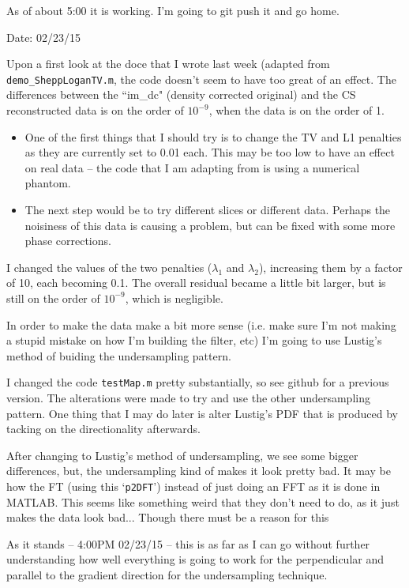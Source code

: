 \documentclass[pra,11 pt]{revtex4-1}
\begin{document}
As of about 5:00 it is working. I'm going to git push it and go home.


Date: 02/23/15

Upon a first look at the doce that I wrote last week (adapted from \verb!demo_SheppLoganTV.m!, the code doesn't seem to have too great of an effect. The differences between the ``im\_dc" (density corrected original) and the CS reconstructed data is on the order of $10^{-9}$, when the data is on the order of 1.

\begin{itemize}
  \item One of the first things that I should try is to change the TV and L1 penalties as they are currently set to 0.01 each. This may be too low to have an effect on real data -- the code that I am adapting from is using a numerical phantom. \\
  \item The next step would be to try different slices or different data. Perhaps the noisiness of this data is causing a problem, but can be fixed with some more phase corrections.
\end{itemize}

I changed the values of the two penalties ($\lambda_1$ and $\lambda_2$), increasing them by a factor of 10, each becoming 0.1. The overall residual became a little bit larger, but is still on the order of $10^{-9}$, which is negligible.

In order to make the data make a bit more sense (i.e. make sure I'm not making a stupid mistake on how I'm building the filter, etc) I'm going to use Lustig's method of buiding the undersampling pattern.

I changed the code \verb!testMap.m! pretty substantially, so see github for a previous version. The alterations were made to try and use the other undersampling pattern. One thing that I may do later is alter Lustig's PDF that is produced by tacking on the directionality afterwards.

After changing to Lustig's method of undersampling, we see some bigger differences, but, the undersampling kind of makes it look pretty bad. It may be how the FT (using this `\verb!p2DFT!') instead of just doing an FFT as it is done in MATLAB. This seems like something weird that they don't need to do, as it just makes the data look bad... Though there must be a reason for this

As it stands -- 4:00PM 02/23/15 -- this is as far as I can go without further understanding how well everything is going to work for the perpendicular and parallel to the gradient direction for the undersampling technique.
\end{document}
